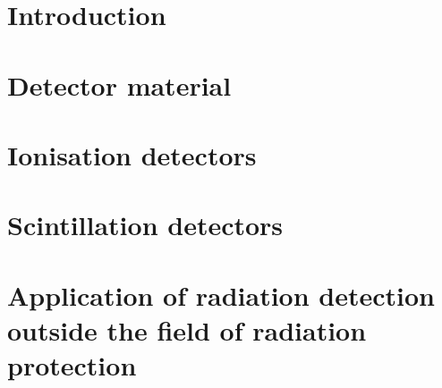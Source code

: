 \section{Introduction}
\section{Detector material}
\section{Ionisation detectors}
\section{Scintillation detectors}
\section{Application of radiation detection outside the field of radiation protection}
